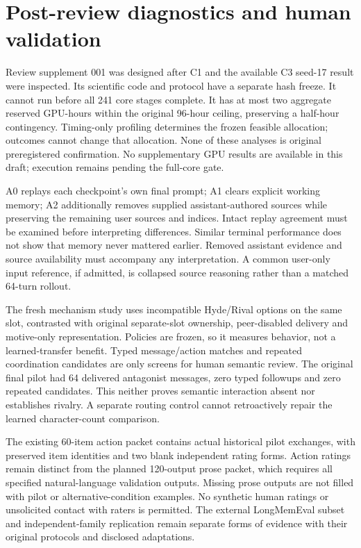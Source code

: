 \documentclass{svproc}
\begin{document}
\section{Post-review diagnostics and human validation}
Review supplement 001 was designed after C1 and the available C3 seed-17 result
were inspected. Its scientific code and protocol have a separate hash freeze.
It cannot run before all 241 core stages complete. It has at most two aggregate
reserved GPU-hours within the original 96-hour ceiling, preserving a half-hour
contingency. Timing-only profiling determines the frozen feasible allocation;
outcomes cannot change that allocation. None of these analyses is original
preregistered confirmation.
No supplementary GPU results are available in this draft; execution remains
pending the full-core gate.

A0 replays each checkpoint's own final prompt; A1 clears explicit working memory;
A2 additionally removes supplied assistant-authored sources while preserving the
remaining user sources and indices. Intact replay agreement must be examined
before interpreting differences. Similar terminal performance does not show that
memory never mattered earlier. Removed assistant evidence and source availability
must accompany any interpretation. A common user-only input reference, if admitted,
is collapsed source reasoning rather than a matched 64-turn rollout.

The fresh mechanism study uses incompatible Hyde/Rival options on the same slot,
contrasted with original separate-slot ownership, peer-disabled delivery and
motive-only representation. Policies are frozen, so it measures behavior, not a
learned-transfer benefit. Typed message/action matches and repeated coordination
candidates are only screens for human semantic review. The original final pilot
had 64 delivered antagonist messages, zero typed followups and zero repeated
candidates. This neither proves semantic interaction absent nor establishes
rivalry. A separate routing control cannot retroactively repair the learned
character-count comparison.

The existing 60-item action packet contains actual historical pilot exchanges,
with preserved item identities and two blank independent rating forms. Action
ratings remain distinct from the planned 120-output prose packet, which requires
all specified natural-language validation outputs. Missing prose outputs are not
filled with pilot or alternative-condition examples. No synthetic human ratings
or unsolicited contact with raters is permitted. The external LongMemEval subset
and independent-family replication remain separate forms of evidence with their
original protocols and disclosed adaptations.
\end{document}
